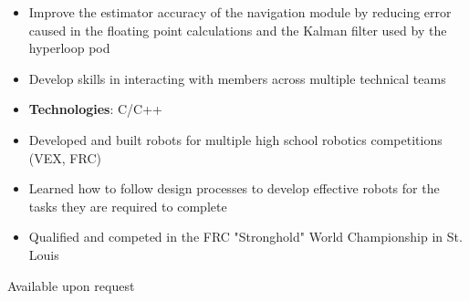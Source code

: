 \documentclass[10pt, letterpaper, ragged2e, withhyper]{altacv}
\begin{document}
\begin{paracol}{2}
    \divider
    
    \begin{itemize}
        \item Improve the estimator accuracy of the navigation module by reducing error caused in the floating point
        calculations and the Kalman filter used by the hyperloop pod
        \item Develop skills in interacting with members across multiple technical teams
        \item \textbf{Technologies}: C/C++
    \end{itemize}

    \divider

    \begin{itemize}
        \item Developed and built robots for multiple high school robotics competitions (VEX, FRC)
        \item Learned how to follow design processes to develop effective robots for the tasks they are required to complete
        \item Qualified and competed in the FRC "Stronghold" World Championship in St. Louis 
    \end{itemize}

    Available upon request

\end{paracol}
\end{document}
